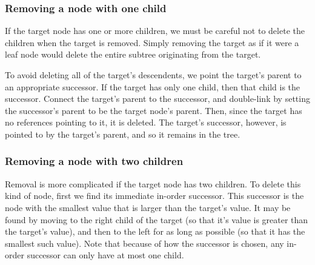 \begin{comment} %
\begin{lstlisting}
<<if the target node does not have children:
	if the target's data is smaller than its parent's data:
		set the parent's left child to None
	else:
		set the parent's right child to None
>>>
\end{lstlisting}
\end{comment}

\subsubsection*{Removing a node with one child}

If the target node has one or more children, we must be careful not to delete the children when the target is removed.
Simply removing the target as if it were a leaf node would delete the entire subtree originating from the target.

To avoid deleting all of the target's descendents, we point the target's parent to an appropriate successor.
If the target has only one child, then that child is the successor.
Connect the target's parent to the successor, and double-link by setting the successor's parent to be the target node's parent.
Then, since the target has no references pointing to it, it is deleted.
The target's successor, however, is pointed to by the target's parent, and so it remains in the tree.

\begin{comment}
\begin{lstlisting} % Pseudocode for removing a node with one child
<<if the target node has one child:
	if target.parent.right is the target:
		set parent's right child to the target's child.
	if target.parent.left is the target:
		set parent's left child to the target's child.>>
\end{lstlisting}
\end{comment}

\subsubsection*{Removing a node with two children}

Removal is more complicated if the target node has two children.
To delete this kind of node, first we find its immediate in-order successor.
This successor is the node with the smallest value that is larger than the target's value.
It may be found by moving to the right child of the target (so that it's value is greater than the target's value), and then to the left for as long as possible (so that it has the smallest such value).
Note that because of how the successor is chosen, any in-order successor can only have at most one child.

